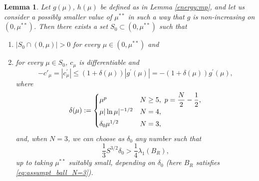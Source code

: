 \documentclass[10pt]{article}
\newtheorem{lemma}[proposition]{Lemma}
\theoremstyle{definition}
\numberwithin{equation}{section}
\begin{document}
\begin{lemma}\label{monoty}
Let $g(\mu)$, $h(\mu)$ be defined as in Lemma \ref{energy:mp}, and let us consider a possibly smaller
value of $\mu^{**}$ in such a way that $g$ is non-increasing on $(0,\mu^{**})$.
Then there exists a set $S_0\subset(0,\mu^{**})$  such that
\begin{enumerate}
\item $\left|S_0 \cap \left(0,\mu\right)\right|>0$ for every $\mu\in (0,\mu^{**})$ and
\item for every $\mu \in S_0$, $c_\mu$ is differentiable and
\begin{equation*}
-c'_\mu = |c^{\prime}_\mu|\leq (1+\delta(\mu))|g^{\prime}(\mu)|=-(1+\delta(\mu))g^{\prime}(\mu),
\end{equation*}
where
\begin{equation}\label{eq:delta_mu}
\delta(\mu):=
\begin{cases}
\mu^p & N\ge5,\ p=\dfrac{N}{2}-\dfrac{1}{2},\\
\mu|\ln \mu|^{-1/2} & N=4,\smallskip\\
\delta_0\mu^{1/2} & N=3,
\end{cases}
\end{equation}
and, when $N=3$, we can choose as $\delta_0$ any number such that
\begin{equation}\label{eq:delta0_N=3}
\frac13 S^{3/2} \delta_0 > \frac14 \lambda_1(B_R),
\end{equation}
up to taking $\mu^{**}$ suitably small, depending on $\delta_0$ (here $B_R$ satisfies \eqref{eq:assumpt_ball_N=3}).
\end{enumerate}
\end{lemma}
%
\end{document}
